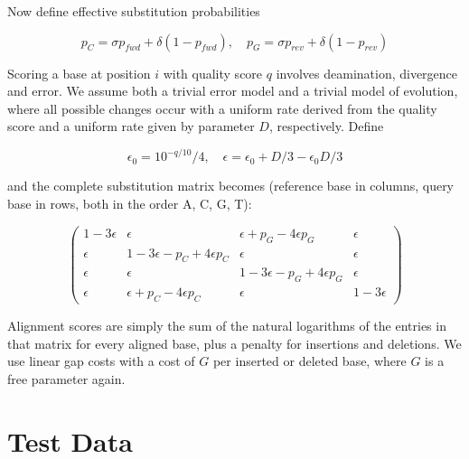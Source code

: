 \documentclass[11pt,a4paper]{report}
\begin{document}
Now define effective substitution probabilities

\begin{equation*}
p_{C} = \sigma p_{fwd} + \delta (1 - p_{fwd}), \quad
p_{G} = \sigma p_{rev} + \delta (1 - p_{rev}) 
\end{equation*}

Scoring a base at position $i$ with quality score $q$ involves
deamination, divergence and error.  We assume both a trivial error model
and a trivial model of evolution, where all possible changes occur with
a uniform rate derived from the quality score and a uniform rate given
by parameter $D$, respectively.  Define 

\begin{equation*}
\epsilon_0 = {10^{-q/10}}/4, \quad \epsilon = \epsilon_0 + D/3 - \epsilon_0 D/3
\end{equation*}

and the complete substitution matrix becomes (reference base in columns,
query base in rows, both in the order A, C, G, T):

\begin{equation*}
\left( \begin{array}{cccc}
1 - 3 \epsilon &       \epsilon                            &       \epsilon + p_{G} - 4 \epsilon p_{G} &       \epsilon \\
      \epsilon & 1 - 3 \epsilon - p_{C} + 4 \epsilon p_{C} &       \epsilon                            &       \epsilon \\
      \epsilon &       \epsilon                            & 1 - 3 \epsilon - p_{G} + 4 \epsilon p_{G} &       \epsilon \\
      \epsilon &       \epsilon + p_{C} - 4 \epsilon p_{C} &       \epsilon                            & 1 - 3 \epsilon 
\end{array} \right)
\end{equation*}

Alignment scores are simply the sum of the natural logarithms of the
entries in that matrix for every aligned base, plus a penalty for
insertions and deletions.  We use linear gap costs with a cost of $G$
per inserted or deleted base, where $G$ is a free parameter again.



\section{Test Data}
\end{document}
